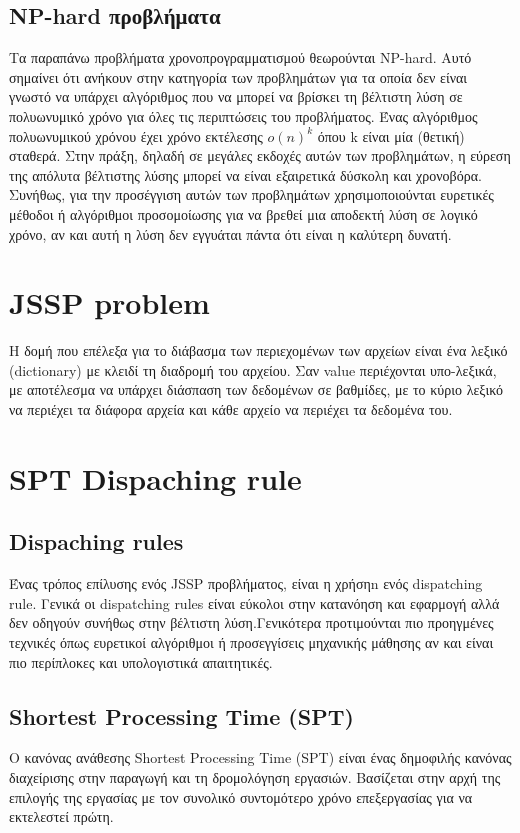 \documentclass{article}
\begin{document}
\subsection * {NP-hard προβλήματα}
Τα παραπάνω προβλήματα χρονοπρογραμματισμού θεωρούνται NP-hard. Αυτό σημαίνει ότι ανήκουν στην κατηγορία των προβλημάτων για τα οποία δεν είναι γνωστό να υπάρχει αλγόριθμος που να μπορεί να βρίσκει τη βέλτιστη λύση σε πολυωνυμικό χρόνο για όλες τις περιπτώσεις του προβλήματος. Ένας αλγόριθμος πολυωνυμικού χρόνου έχει χρόνο εκτέλεσης $o(n)^k$ όπου k είναι μία (θετική) σταθερά. Στην πράξη, δηλαδή σε μεγάλες εκδοχές αυτών των προβλημάτων, η εύρεση της απόλυτα βέλτιστης λύσης μπορεί να είναι εξαιρετικά δύσκολη και χρονοβόρα. Συνήθως, για την προσέγγιση αυτών των προβλημάτων χρησιμοποιούνται ευρετικές μέθοδοι ή αλγόριθμοι προσομοίωσης για να βρεθεί μια αποδεκτή λύση σε λογικό χρόνο, αν και αυτή η λύση δεν εγγυάται πάντα ότι είναι η καλύτερη δυνατή.



\section{JSSP problem}
Η δομή που επέλεξα για το διάβασμα των περιεχομένων των αρχείων είναι ένα λεξικό (dictionary) με κλειδί τη διαδρομή του αρχείου. Σαν value περιέχονται υπο-λεξικά, με αποτέλεσμα να υπάρχει διάσπαση των δεδομένων σε βαθμίδες, με το κύριο λεξικό να περιέχει τα διάφορα αρχεία και κάθε αρχείο να περιέχει τα δεδομένα του.



\section{SPT Dispaching rule}
\vspace{0.2cm}

\subsection{Dispaching rules}
Ένας τρόπος επίλυσης ενός JSSP προβλήματος, είναι η χρήσηn ενός dispatching rule. Γενικά οι dispatching rules είναι εύκολοι στην κατανόηση και εφαρμογή αλλά δεν οδηγούν συνήθως στην βέλτιστη λύση.Γενικότερα προτιμούνται πιο προηγμένες τεχνικές όπως ευρετικοί αλγόριθμοι ή προσεγγίσεις μηχανικής μάθησης αν και είναι πιο περίπλοκες και υπολογιστικά απαιτητικές.

\subsection{Shortest Processing Time (SPT)}
Ο κανόνας ανάθεσης Shortest Processing Time (SPT) είναι ένας δημοφιλής κανόνας διαχείρισης στην παραγωγή και τη δρομολόγηση εργασιών. Βασίζεται στην αρχή της επιλογής της εργασίας με τον συνολικό συντομότερο χρόνο επεξεργασίας για να εκτελεστεί πρώτη.
\end{document}
